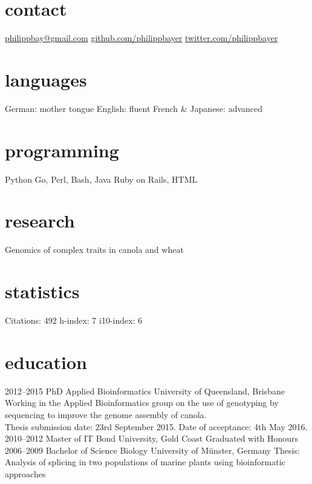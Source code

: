 \documentclass[]{friggeri-cv} %
\begin{document}


\begin{aside} %
\section{contact}
\href{mailto:philippbay@gmail.com}{philippbay@gmail.com}
\href{http://github.com/philippbayer}{github.com/philippbayer}
\href{http://twitter.com/philippbayer}{twitter.com/philippbayer}
\section{languages}
German: mother tongue
English: fluent
French \& Japanese: advanced
\section{programming}
Python
Go, Perl, Bash, Java
Ruby on Rails, HTML
\section{research}
Genomics of complex traits in canola and wheat
\section{statistics}
Citations: 492
h-index: 7
i10-index: 6
\end{aside}


\section{education}

\begin{entrylist}
\entry
{2012--2015}
{PhD {\normalfont Applied Bioinformatics}}
{University of Queensland, Brisbane}
{Working in the Applied Bioinformatics group on the use of genotyping by sequencing to improve the genome assembly of canola.\\Thesis submission date: 23rd September 2015. Date of acceptance: 4th May 2016.}
\entry
{2010--2012}
{Master {\normalfont of IT}}
{Bond University, Gold Coast}
{Graduated with Honours}
\entry
{2006--2009}
{Bachelor of Science {\normalfont Biology}}
{University of Münster, Germany}
{Thesis: Analysis of splicing in two populations of marine plants
using bioinformatic approaches}
\end{entrylist}
\end{document}
